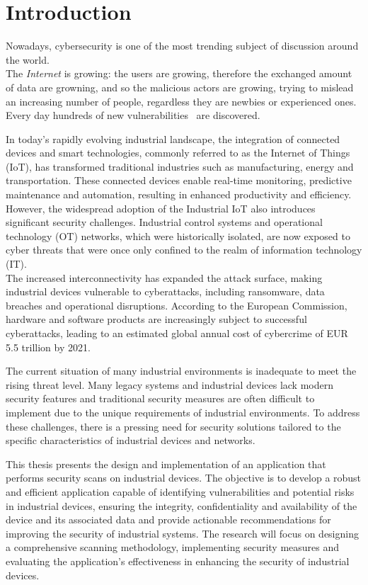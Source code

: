 \chapter{Introduction}
\label{cha:intro}

Nowadays, cybersecurity is one of the most trending subject of discussion around the world.~\cite{trends-computer-science}\\

The \textit{Internet} is growing: the users are growing, therefore the exchanged amount of data are growning, and so the malicious actors are growing, trying to mislead an increasing number of people, regardless they are newbies or experienced ones. Every day hundreds of new vulnerabilities~\cite{cve-details-db} are discovered.

In today's rapidly evolving industrial landscape, the integration of connected devices and smart technologies, commonly referred to as the Internet of Things (IoT), has transformed traditional industries such as manufacturing, energy and transportation. These connected devices enable real-time monitoring, predictive maintenance and automation, resulting in enhanced productivity and efficiency. \\
However, the widespread adoption of the Industrial IoT also introduces significant security challenges. Industrial control systems and operational technology (OT) networks, which were historically isolated, are now exposed to cyber threats that were once only confined to the realm of information technology (IT). \\
The increased interconnectivity has expanded the attack surface, making industrial devices vulnerable to cyberattacks, including ransomware, data breaches and operational disruptions. According to the European Commission, hardware and software products are increasingly subject to successful cyberattacks, leading to an estimated global annual cost of cybercrime of EUR 5.5 trillion by 2021.~\cite{eu-regulation-horizontal-cybersecurity}

The current situation of many industrial environments is inadequate to meet the rising threat level. Many legacy systems and industrial devices lack modern security features and traditional security measures are often difficult to implement due to the unique requirements of industrial environments. To address these challenges, there is a pressing need for security solutions tailored to the specific characteristics of industrial devices and networks.

This thesis presents the design and implementation of an application that performs security scans on industrial devices. The objective is to develop a robust and efficient application capable of identifying vulnerabilities and potential risks in industrial devices, ensuring the integrity, confidentiality and availability of the device and its associated data and provide actionable recommendations for improving the security of industrial systems. The research will focus on designing a comprehensive scanning methodology, implementing security measures and evaluating the application's effectiveness in enhancing the security of industrial devices.

